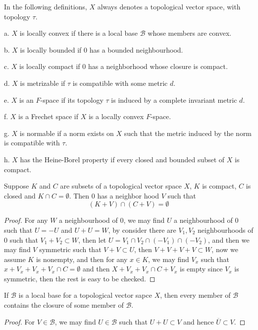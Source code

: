\begin{definition}
    In the following definitions, $X$ always denotes a topological vector space, with topology $\tau$.\par
    a. $X$ is locally convex if there is a local base $\mathscr{B}$ whose members are convex.\par
    b. $X$ is locally bounded if $0$ has a bounded neighbourhood.\par
    c. $X$ is locally compact if $0$ has a neighborhood whose closure is compact.\par
    d. $X$ is metrizable if $\tau$ is compatible with some metric $d$.\par
    e. $X$ is an $F$-space if its topology $\tau$ is induced by a complete invariant metric $d$.\par
    f. $X$ is a Frechet space if $X$ is a locally convex $F$-space.\par
    g. $X$ is normable if a norm exists on $X$ such that the metric induced by the norm is compatible with $\tau$.\par
    h. $X$ has the Heine-Borel property if every closed and bounded subset of $X$ is compact.
\end{definition}

\begin{theorem}
    Suppose $K$ and $C$ are subsets of a topological vector space $X$, $K$ is compact, $C$ is closed and $K\cap C = \emptyset$. Then $0$ has a neighbor hood $V$ such that
    \[
    (K+V)\cap(C+V) = \emptyset
    \]
\end{theorem}
\begin{proof}
    For any $W$ a neighbourhood of $0$, we may find $U$ a neighbourhood of $0$ such that $U=-U$ and $U+U = W$, by consider there are $V_1,V_2$ neighbourhoods of $0$ such that $V_1+V_2 \subset W$, then let $U = V_1\cap V_2 \cap (-V_1)\cap(-V_2)$, and then we may find $V$ symmetric such that $V+V\subset U$, then $V+V+V+V \subset W$, now we assume $K$ is nonempty, and then for any $x\in K$, we may find $V_x$ such that $x+V_x+V_x+V_x \cap C =\emptyset$ and then $X+V_x+V_x\cap C+V_x$ is empty since $V_x$ is symmetric, then the rest is easy to be checked.
\end{proof}

\begin{theorem}
    If $\mathscr{B}$ is a local base for a topological vector sapce $X$, then every member of $\mathscr{B}$ contains the closure of some member of $\mathscr{B}$.
\end{theorem}
\begin{proof}
    For $V\in \mathscr{B}$,  we may find $U\in \mathscr{B}$ such that $U+U\subset V$ and hence $\overline{U} \subset V$.
\end{proof}

